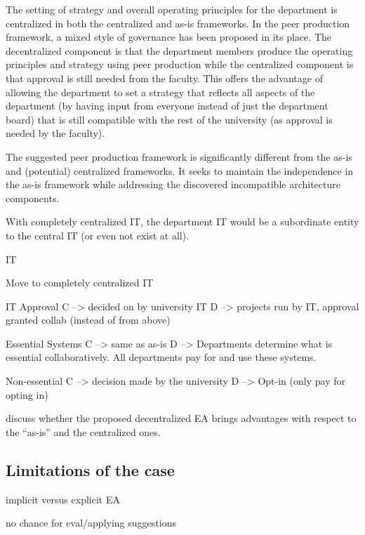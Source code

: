 The setting of strategy and overall operating principles for the department is centralized in both the centralized and as-is frameworks. In the peer production framework, a mixed style of governance has been proposed in its place. The decentralized component is that the department members produce the operating principles and strategy using peer production while the centralized component is that approval is still needed from the faculty. This offers the advantage of allowing the department to set a strategy that reflects all aspects of the department (by having input from everyone instead of just the department board) that is still compatible with the rest of the university (as approval is needed by the faculty).





The suggested peer production framework is significantly different from the as-is and (potential) centralized frameworks. It seeks to maintain the independence in the as-is framework while addressing the discovered incompatible architecture components.

With completely centralized IT, the department IT would be a subordinate entity to the central IT (or even not exist at all). 

IT 

Move to completely centralized IT

IT Approval
 C --> decided on by university IT
 D --> projects run by IT, approval granted collab (instead of from above)

Essential Systems 
 C --> same as as-is
 D --> Departments determine what is essential collaboratively. All departments pay for and use these systems.

Non-essential
 C --> decision made by the university
 D --> Opt-in (only pay for opting in)

discuss whether the proposed decentralized EA brings advantages with respect to the ``as-is'' and the centralized ones. 

\subsection{Limitations of the case}

implicit versus explicit EA

no chance for eval/applying suggestions




  